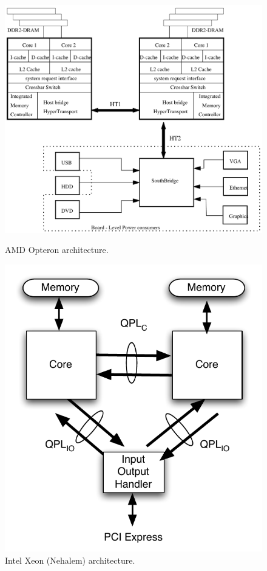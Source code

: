 \documentclass[acmtaco]{acmtrans2m}
\begin{document}
\begin{figure}[tp]
  \begin{minipage}{0.5\linewidth}
  \centering
     \includegraphics[scale=0.3]{x2200sys}
     \caption{AMD Opteron architecture.}
     \label{fig:amdarch}
  \end{minipage}\hspace{0.1cm}
  \begin{minipage}{0.5\linewidth}
  \centering
     \includegraphics[scale=0.5]{intelnehalem}
     \caption{Intel Xeon (Nehalem) architecture.}
     \label{fig:intarch}
  \end{minipage}
\end{figure}
\end{document}
